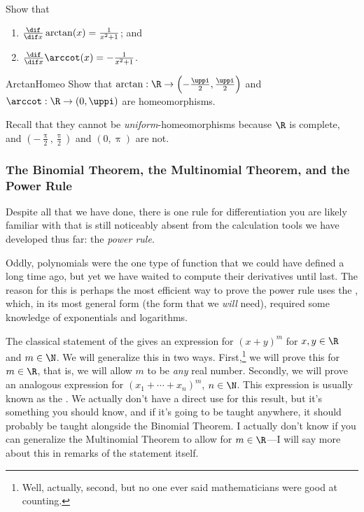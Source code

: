 \begin{exr}{}{}
Show that
\begin{enumerate}
\item $\frac{\dif}{\dif x}\arctan (x)=\frac{1}{x^2+1}$; and
\item $\frac{\dif}{\dif x}\arccot (x)=-\frac{1}{x^2+1}$.
\end{enumerate}
\end{exr}
\begin{exr}{}{ArctanHomeo}
Show that $\arctan :\R \rightarrow \left( -\frac{\uppi}{2},\frac{\uppi}{2}\right)$ and $\arccot :\R \rightarrow (0,\uppi )$ are homeomorphisms.
\begin{rmk}
Recall that they cannot be \emph{uniform}-homeomorphisms because $\R$ is complete, and $\left( -\frac{\uppi}{2},\frac{\uppi}{2}\right)$ and $(0,\uppi )$ are not.
\end{rmk}
\end{exr}

\subsubsection{The Binomial Theorem, the Multinomial Theorem, and the Power Rule}

Despite all that we have done, there is one rule for differentiation you are likely familiar with that is still noticeably absent from the calculation tools we have developed thus far:  the \emph{power rule}.

Oddly, polynomials were the one type of function that we could have defined a long time ago, but yet we have waited to compute their derivatives until last.  The reason for this is perhaps the most efficient way to prove the power rule uses the \emph{}, which, in its most general form (the form that we \emph{will} need), required some knowledge of exponentials and logarithms.

The classical statement of the  gives an expression for $(x+y)^m$ for $x,y\in \R$ and $m\in \N$.  We will generalize this in two ways.  First,\footnote{Well, actually, second, but no one ever said mathematicians were good at counting.} we will prove this for $m\in \R$, that is, we will allow $m$ to be \emph{any} real number.  Secondly, we will prove an analogous expression for $(x_1+\cdots +x_n)^m$, $n\in \N$.  This expression is usually known as the \emph{}.  We actually don't have a direct use for this result, but it's something you should know, and if it's going to be taught anywhere, it should probably be taught alongside the Binomial Theorem.  I actually don't know if you can generalize the Multinomial Theorem to allow for $m\in \R$---I will say more about this in remarks of the statement itself.

